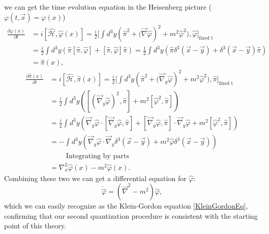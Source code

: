 we can get the time evolution equation in the Heisenberg picture ($\varphi(t,\vec x)=\varphi(x)$)
\begin{align*}
    \frac{\partial\hat{\varphi}(x)}{\partial t}&=i[\hat{\mathcal{H} },\hat{\varphi}(x)]=\frac{i}{2}\bigg[\int d^3y(\hat{\pi}^2+\big(\vec\nabla\hat{\varphi})^2+m^2\hat\varphi^2\big),\hat\varphi\bigg]_{\text{fixed t}}\\&=\frac{i}{2}\int d^3y(\hat\pi[\hat\pi,\hat\varphi]+[\hat\pi,\hat\varphi]\hat\pi)=\frac{1}{2}\int d^3y(\hat\pi\delta^3(\vec x-\vec y)+\delta^3(\vec x-\vec y)\hat\pi)\\&=\hat\pi(x),
    \end{align*}\begin{align*}
    \frac{\partial\hat{\pi}(x)}{\partial t}&=i[\hat{\mathcal{H} },\hat{\pi}(x)]=\frac{i}{2}\bigg[\int d^3y(\hat{\pi}^2+\big(\vec\nabla_y\hat{\varphi})^2+m^2\hat\varphi^2\big),\hat\pi\bigg]_{\text{fixed t}}\\
    &=\frac{i}{2}\int d^3y([(\vec\nabla_y\hat\varphi)^2,\hat\pi]+m^2[\hat\varphi^2,\hat\pi])\\&=\frac{i}{2}\int d^3y(\vec\nabla_y\hat\varphi\cdot[\vec\nabla_y\hat\varphi,\hat\pi]+[\vec\nabla_y\hat\varphi,\hat\pi]\cdot\vec\nabla_y\hat\varphi+m^2[\hat\varphi^2,\hat\pi])\\
    &=-\int d^3y(\vec\nabla_y\hat\varphi\cdot\vec\nabla_y\delta^3(\vec x-\vec y)+m^2\hat\varphi\delta^3(\vec x-\vec y))\\&\qquad\text{ Integrating by parts}\\&=\nabla^2_x\hat\varphi(x)-m^2\hat\varphi(x).
\end{align*}
Combining these two we can get a differential equation for $\hat\varphi$:
\begin{equation*}
    \ddot{\hat{\varphi}}=(\vec\nabla^2-m^2)\hat\varphi,
\end{equation*}
which we can easily recognize as the Klein-Gordon equation \eqref{KleinGordonEq}, confirming that our second quantization procedure is consistent with the starting point of this theory.\\


